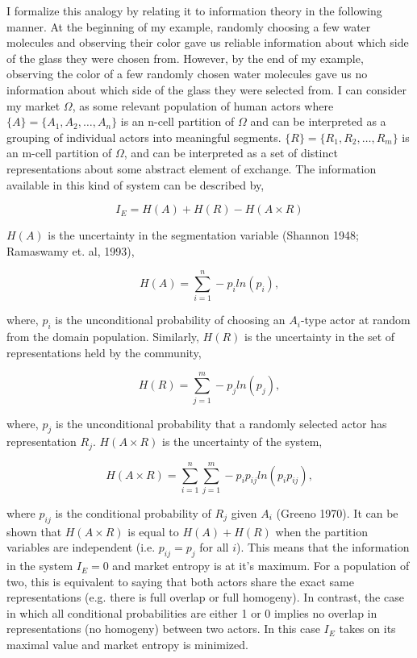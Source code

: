 I formalize this analogy by relating it to information theory in the following manner. At the beginning of my example, randomly choosing a few water molecules and observing their color gave us reliable information about which side of the glass they were chosen from. However, by the end of my example, observing the color of a few randomly chosen water molecules gave us no information about which side of the glass they were selected from.  I can consider my market $\Omega$, as some relevant population of human actors where $\{A\} = \{A_1, A_2,\ldots,A_n\}$ is an n-cell partition of $\Omega$ and can be interpreted as a grouping of individual actors into meaningful segments. $\{R\} = \{R_1, R_2,\ldots,R_m\}$ is an m-cell partition of $\Omega$, and can be interpreted as a set of distinct representations about some abstract element of exchange.  The information available in this kind of system can be described by,

\begin{equation}
I_E = H(A)+H(R)-H(A \times R)
\end{equation}

$H(A)$ is the uncertainty in the segmentation variable (Shannon 1948; Ramaswamy et. al, 1993), 

\begin{equation}
\nonumber H(A) = \sum_{i=1}^n -p_i ln(p_i),
\end{equation}

\noindent where, $p_i$ is the unconditional probability of choosing an $A_i$-type actor at random from the domain population. Similarly, $H(R)$ is the uncertainty in the set of representations held by the community,

\begin{equation}
\nonumber H(R) = \sum_{j=1}^m -p_j ln(p_j),
\end{equation}

\noindent where, $p_j$ is the unconditional probability that a randomly selected actor has representation $R_j$. $H(A \times R)$ is the uncertainty of the system,

\begin{equation}
\nonumber H(A \times R) = \sum_{i=1}^n\sum_{j=1}^m -p_ip_{ij}ln(p_ip_{ij}),
\end{equation}

\noindent where $p_{ij}$ is the conditional probability of $R_j$ given $A_i$ (Greeno 1970). It can be shown that $H(A \times R)$ is equal to $H(A) + H(R)$ when the partition variables are independent (i.e. $p_{ij} = p_j$ for all $i$). This means that the information in the system $I_E = 0$ and market entropy is at it's maximum. For a population of two, this is equivalent to saying that both actors share the exact same representations (e.g. there is full overlap or full homogeny). In contrast, the case in which all conditional probabilities are either 1 or 0 implies no overlap in representations (no homogeny) between two actors. In this case $I_E$ takes on its maximal value and market entropy is minimized.
 
